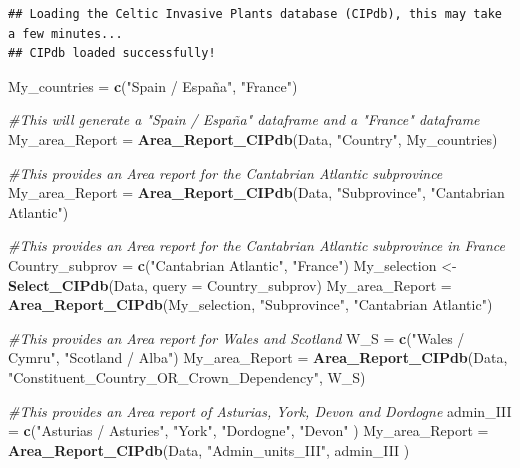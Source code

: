 \documentclass[
]{article}
\newenvironment{Shaded}{\begin{snugshade}}{\end{snugshade}}
\newcommand{\AttributeTok}[1]{\textcolor[rgb]{0.13,0.29,0.53}{#1}}
\newcommand{\CommentTok}[1]{\textcolor[rgb]{0.56,0.35,0.01}{\textit{#1}}}
\newcommand{\FunctionTok}[1]{\textcolor[rgb]{0.13,0.29,0.53}{\textbf{#1}}}
\newcommand{\NormalTok}[1]{#1}
\newcommand{\OtherTok}[1]{\textcolor[rgb]{0.56,0.35,0.01}{#1}}
\newcommand{\StringTok}[1]{\textcolor[rgb]{0.31,0.60,0.02}{#1}}
\begin{document}
\begin{verbatim}
## Loading the Celtic Invasive Plants database (CIPdb), this may take a few minutes...
## CIPdb loaded successfully!
\end{verbatim}

\begin{Shaded}
\begin{Highlighting}[]
\NormalTok{My\_countries }\OtherTok{=} \FunctionTok{c}\NormalTok{(}\StringTok{"Spain / España"}\NormalTok{, }\StringTok{"France"}\NormalTok{)}

\CommentTok{\#This will generate  a "Spain / España" dataframe and a "France" dataframe}
\NormalTok{My\_area\_Report }\OtherTok{=} \FunctionTok{Area\_Report\_CIPdb}\NormalTok{(Data, }\StringTok{"Country"}\NormalTok{, My\_countries)}

\CommentTok{\#This provides an Area report for the Cantabrian Atlantic subprovince}
\NormalTok{ My\_area\_Report }\OtherTok{=} \FunctionTok{Area\_Report\_CIPdb}\NormalTok{(Data, }\StringTok{"Subprovince"}\NormalTok{, }\StringTok{"Cantabrian Atlantic"}\NormalTok{)}

\CommentTok{\#This provides an Area report for the Cantabrian Atlantic subprovince in France}
\NormalTok{Country\_subprov }\OtherTok{=} \FunctionTok{c}\NormalTok{(}\StringTok{"Cantabrian Atlantic"}\NormalTok{, }\StringTok{"France"}\NormalTok{)}
\NormalTok{My\_selection }\OtherTok{\textless{}{-}} \FunctionTok{Select\_CIPdb}\NormalTok{(Data, }\AttributeTok{query =}\NormalTok{ Country\_subprov)}
\NormalTok{My\_area\_Report }\OtherTok{=} \FunctionTok{Area\_Report\_CIPdb}\NormalTok{(My\_selection, }\StringTok{"Subprovince"}\NormalTok{, }\StringTok{"Cantabrian Atlantic"}\NormalTok{)}

\CommentTok{\#This provides an Area report for Wales and Scotland}
\NormalTok{W\_S }\OtherTok{=} \FunctionTok{c}\NormalTok{(}\StringTok{"Wales / Cymru"}\NormalTok{, }\StringTok{"Scotland / Alba"}\NormalTok{)}
\NormalTok{My\_area\_Report }\OtherTok{=} \FunctionTok{Area\_Report\_CIPdb}\NormalTok{(Data, }\StringTok{"Constituent\_Country\_OR\_Crown\_Dependency"}\NormalTok{, W\_S)}

\CommentTok{\#This provides an Area report of Asturias, York, Devon and Dordogne}
\NormalTok{admin\_III }\OtherTok{=} \FunctionTok{c}\NormalTok{(}\StringTok{"Asturias / Asturies"}\NormalTok{, }\StringTok{"York"}\NormalTok{, }\StringTok{"Dordogne"}\NormalTok{, }\StringTok{"Devon"}\NormalTok{ )}
\NormalTok{My\_area\_Report }\OtherTok{=} \FunctionTok{Area\_Report\_CIPdb}\NormalTok{(Data, }\StringTok{"Admin\_units\_III"}\NormalTok{, admin\_III )}
\end{Highlighting}
\end{Shaded}
\end{document}

